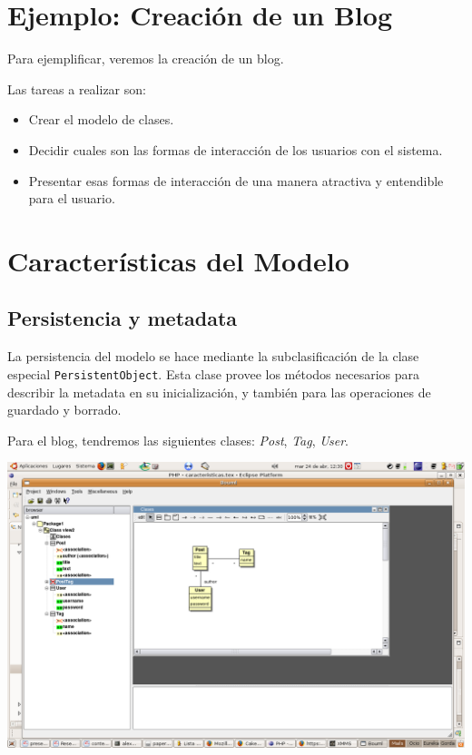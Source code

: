 \section{Ejemplo: Creación de un Blog}
Para ejemplificar, veremos la creación de un blog.

Las tareas a realizar son:
\begin{itemize}
\item Crear el modelo de clases.
\item Decidir cuales son las formas de interacción de los usuarios con el sistema.
\item Presentar esas formas de interacción de una manera atractiva y entendible para el usuario.
\end{itemize}

\section{Características del Modelo}

\subsection{Persistencia y metadata}
\label{sub-pers}

La persistencia del modelo se hace mediante la subclasificación de la clase especial \verb"PersistentObject".
Esta clase provee los métodos necesarios para describir la metadata en su inicialización, y también para las operaciones de guardado y borrado.

Para el blog, tendremos las siguientes clases: \emph{Post}, \emph{Tag}, \emph{User}.

\includegraphics*[scale=0.60,viewport=420 350 700 600]{diagrama.png}

